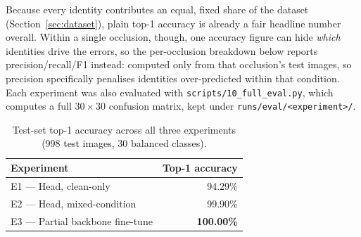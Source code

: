 \documentclass[11pt]{article}
\begin{document}
Because every identity contributes an equal, fixed share of the dataset (Section~\ref{sec:dataset}), plain top-1 accuracy is already a fair headline number overall. Within a single occlusion, though, one accuracy figure can hide \emph{which} identities drive the errors, so the per-occlusion breakdown below reports precision/recall/F1 instead: computed only from that occlusion's test images, so precision specifically penalises identities over-predicted within that condition. Each experiment was also evaluated with \texttt{scripts/10\_full\_eval.py}, which computes a full $30\times30$ confusion matrix, kept under \texttt{runs/eval/<experiment>/}.

\begin{table}[h]
\centering
\caption{Test-set top-1 accuracy across all three experiments (998 test images, 30 balanced classes).}
\begin{tabular}{lr}
\toprule
\textbf{Experiment} & \textbf{Top-1 accuracy} \\
\midrule
E1 — Head, clean-only & 94.29\% \\
E2 — Head, mixed-condition & 99.90\% \\
E3 — Partial backbone fine-tune & \textbf{100.00\%} \\
\bottomrule
\end{tabular}
\end{table}
\end{document}
